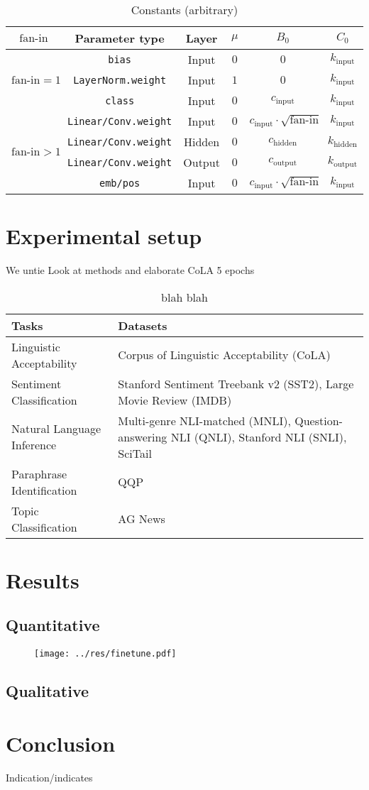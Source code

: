 \documentclass{article}
\newcommand{\fanin}{\text{fan-in}}
\newcommand{\cinput}{c_{\text{input}}}
\newcommand{\chidden}{c_{\text{hidden}}}
\newcommand{\coutput}{c_{\text{output}}}
\newcommand{\kinput}{k_{\text{input}}}
\newcommand{\khidden}{k_{\text{hidden}}}
\newcommand{\koutput}{k_{\text{output}}}
\begin{document}
\begin{table}[h!]
\Centering
\begin{tabular}{cccccc}
\toprule
    $\fanin$ & Parameter type & Layer & $\mu$ & $B_0$ & $C_0$\\
\midrule
\multirow{3}{*}{$\fanin=1$} & \texttt{bias} & Input & $0$ & $0$ & $\kinput$\\
& \texttt{LayerNorm.weight} & Input & $1$ & $0$ & $\kinput$\\
& \texttt{class} & Input & $0$ & $\cinput$ & $\kinput$\\
\cmidrule{1-6}
\multirow{4}{*}{$\fanin>1$} & \texttt{Linear/Conv.weight}  & Input & $0$ & $\cinput \cdot \sqrt{\fanin}$ & $\kinput$\\
& \texttt{Linear/Conv.weight}  & Hidden & $0$ & $\chidden$ & $\khidden$\\
& \texttt{Linear/Conv.weight}  & Output & $0$ & $\coutput$ & $\koutput$\\
\cmidrule{2-6}
& \texttt{emb/pos} & Input & $0$ & $\cinput \cdot \sqrt{\fanin}$ & $\kinput$\\
\bottomrule
\end{tabular}
\caption{Constants (arbitrary)}
\end{table}


\section{Experimental setup}
We untie
Look at methods and elaborate
CoLA 5 epochs

\begin{table}[h!]
\Centering
\begin{tabular}{lp{20em}}
\toprule
\textbf{Tasks} & \textbf{Datasets} \\
\midrule
Linguistic Acceptability & Corpus of Linguistic Acceptability (CoLA) \\
Sentiment Classification & Stanford Sentiment Treebank v2 (SST2), Large Movie Review (IMDB) \\
Natural Language Inference & Multi-genre NLI-matched (MNLI), Question-answering NLI (QNLI), Stanford NLI (SNLI), SciTail \\
Paraphrase Identification & QQP \\
Topic Classification & AG News \\
\bottomrule
\end{tabular}
\caption{blah blah}
\end{table}

\section{Results}
\subsection{Quantitative}
\begin{figure}
\texttt{[image: ../res/finetune.pdf]}
\end{figure}

\subsection{Qualitative}

\section{Conclusion}
Indication/indicates

\printbibliography
\end{document}
